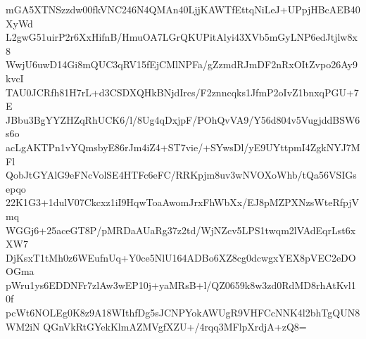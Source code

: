 mGA5XTNSzzdw00fkVNC246N4QMAn40LjjKAWTfEttqNiLeJ+UPpjHBcAEB40XyWd
L2gwG51uirP2r6XxHifnB/HmuOA7LGrQKUPitAlyi43XVb5mGyLNP6edJtjlw8x8
WwjU6uwD14Gi8mQUC3qRV15fEjCMlNPFa/gZzmdRJmDF2nRxOItZvpo26Ay9kvcI
TAU0JCRfh81H7rL+d3CSDXQHkBNjdIrcs/F2znncqks1JfmP2oIvZ1bnxqPGU+7E
JBbu3BgYYZHZqRhUCK6/l/8Ug4qDxjpF/POhQvVA9/Y56d804v5VugjddBSW6s6o
acLgAKTPn1vYQmsbyE86rJm4iZ4+ST7vie/+SYwsDl/yE9UYttpmI4ZgkNYJ7MFl
QobJtGYAlG9eFNcVolSE4HTFc6eFC/RRKpjm8uv3wNVOXoWhb/tQa56VSIGsepqo
22K1G3+1dulV07Ckcxz1iI9HqwToaAwomJrxFhWbXx/EJ8pMZPXNzsWteRfpjVmq
WGGj6+25aceGT8P/pMRDaAUaRg37z2td/WjNZcv5LPS1twqm2lVAdEqrLst6xXW7
DjKsxT1tMh0z6WEufnUq+Y0ce5NlU164ADBo6XZ8cg0dcwgxYEX8pVEC2eDOOGma
pWru1ys6EDDNFr7zlAw3wEP10j+yaMRsB+l/QZ0659k8w3zd0RdMD8rhAtKvl10f
pcWt6NOLEg0K8z9A18WIthfDg5sJCNPYokAWUgR9VHFCcNNK4l2bhTgQUN8WM2iN
QGnVkRtGYekKlmAZMVgfXZU+/4rqq3MFlpXrdjA+zQ8=
